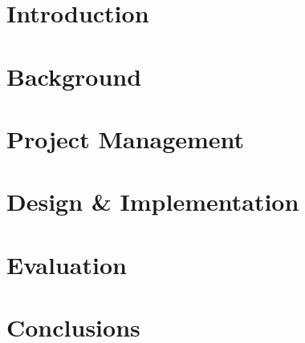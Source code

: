 \documentclass[a4paper,fleqn,10pt]{report} %
\begin{document}
\normalem



\pagestyle{plain}

\newpage


\newpage
\tableofcontents

\newpage

\chapter{Introduction}


\chapter{Background}\label{sec:background}


\chapter{Project Management}\label{ch:project-management}

\chapter{Design \& Implementation}\label{sec:design}


% 

\chapter{Evaluation}\label{sec:evaluation}


\chapter{Conclusions}\label{sec:conclusions}


\printbibliography


\end{document}
